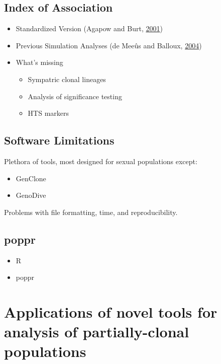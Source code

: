 \documentclass[double,12pt]{beavtex}
\providecommand{\tightlist}{%
  \setlength{\itemsep}{0pt}\setlength{\parskip}{0pt}}
\begin{document}
  \subsection{Index of Association}\label{index-of-association}
  
  \begin{itemize}
  \tightlist
  \item
    Standardized Version (Agapow and Burt,
    \protect\hyperlink{ref-Agapow_2001}{2001})
  \item
    Previous Simulation Analyses (de Meeûs and Balloux,
    \protect\hyperlink{ref-de2004clonal}{2004})
  \item
    What's missing
  
    \begin{itemize}
    \tightlist
    \item
      Sympatric clonal lineages
    \item
      Analysis of significance testing
    \item
      HTS markers
    \end{itemize}
  \end{itemize}
  
  \subsection{Software Limitations}\label{software-limitations}
  
  Plethora of tools, most designed for sexual populations except:
  
  \begin{itemize}
  \tightlist
  \item
    GenClone
  \item
    GenoDive
  \end{itemize}
  
  Problems with file formatting, time, and reproducibility.
  
  \subsection{poppr}\label{poppr}
  
  \begin{itemize}
  \tightlist
  \item
    R
  \item
    poppr
  \end{itemize}
  
  \section{Applications of novel tools for analysis of partially-clonal
  populations}\label{applications-of-novel-tools-for-analysis-of-partially-clonal-populations}
  
\end{document}
